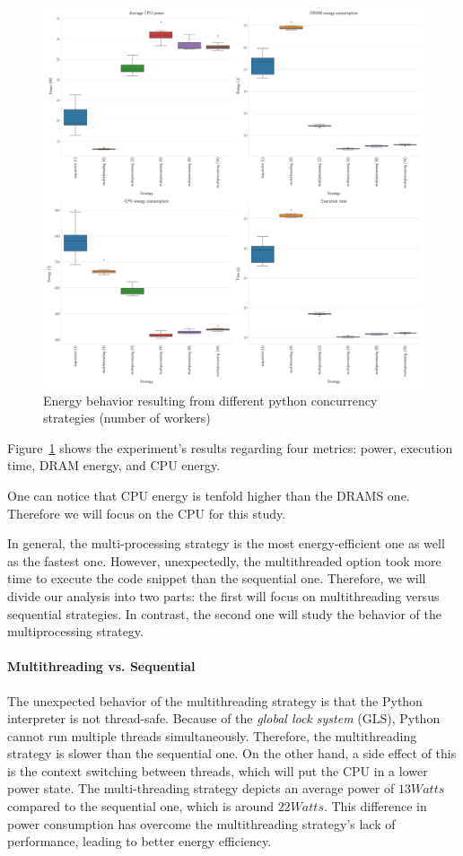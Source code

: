 \begin{figure}[!hbt]
    \centering
    \includegraphics[width=\linewidth]{imgs/python_multiprocessing}
    \caption{Energy behavior resulting from different python concurrency strategies (number of workers) }
    \label{fig:python_multiprocessing}
\end{figure}

Figure~\ref{fig:python_multiprocessing} shows the experiment's results regarding four metrics: power, execution time, DRAM energy, and CPU energy.

One can notice that CPU energy is tenfold higher than the DRAMS one. Therefore we will focus on the CPU for this study.

In general, the multi-processing strategy is the most energy-efficient one as well as the fastest one. However, unexpectedly, the multithreaded option took more time to execute the code snippet than the sequential one.
Therefore, we will divide our analysis into two parts: the first will focus on multithreading versus sequential strategies. In contrast, the second one will study the behavior of the multiprocessing strategy.

\paragraph*{Multithreading vs. Sequential}
The unexpected behavior of the multithreading strategy is that the Python interpreter is not thread-safe.
Because of the \emph{global lock system} (GLS), Python cannot run multiple threads simultaneously. Therefore, the multithreading strategy is slower than the sequential one.
On the other hand, a side effect of this is the context switching between threads, which will put the CPU in a lower power state. The multi-threading strategy depicts an average power of $13 Watts$ compared to the sequential one, which is around $22 Watts$. This difference in power consumption has overcome the multithreading strategy's lack of performance, leading to better energy efficiency.


